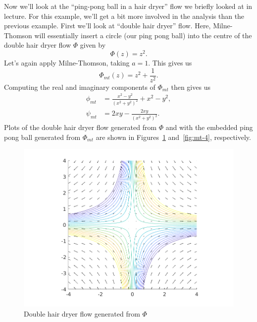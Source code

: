 \documentclass{article}
\begin{document}
Now we'll look at the ``ping-pong ball in a hair dryer'' flow we briefly
looked at in lecture. For this example, we'll get a bit more involved in
the analysis than the previous example. First we'll look at ``double
hair dryer'' flow. Here, Milne-Thomson will essentially insert a circle
(our ping pong ball) into the centre of the double hair dryer
flow $\Phi$ given by
%
\begin{equation*}
    \Phi(z) = z^2
    .
\end{equation*}
%
Let's again apply Milne-Thomson, taking $a = 1$. This gives us
%
\begin{equation*}
    \Phi_{mt}(z) = z^2 + \frac{1}{z^2}
    .
\end{equation*}
%
Computing the real and imaginary components of $\Phi_{mt}$ then gives us
%
\begin{align*}
    \phi_{mt} &= \frac{x^2 - y^2}{(x^2 + y^2)^2} + x^2 - y^2, \\
    \psi_{mt} &= 2 x y - \frac{2 x y}{(x^2 + y^2)^2}
    .
\end{align*}
%
Plots of the double hair dryer flow generated from $\Phi$ and with the
embedded ping pong ball generated from $\Phi_{mt}$ are shown in
Figures~\ref{fig:mt-3} and~\ref{fig:mt-4}, respectively.
%
\begin{figure}[ht]
    \includegraphics[width=35em]{mt_ex2_1}
    \centering
    \caption{Double hair dryer flow generated from $\Phi$}
    \label{fig:mt-3}
\end{figure}
%
\end{document}
